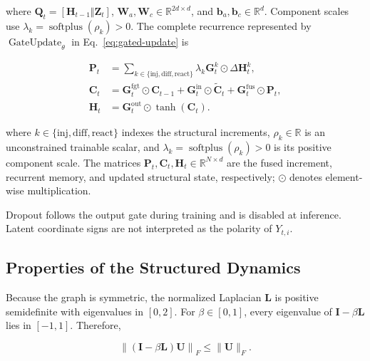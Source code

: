 \documentclass[letterpaper]{article} %
\begin{document}
where \(\mathbf Q_t=[\mathbf H_{t-1}\Vert\mathbf Z_t]\), \(\mathbf W_a,\mathbf W_c\in\mathbb R^{2d\times d}\), and \(\mathbf b_a,\mathbf b_c\in\mathbb R^d\). Component scales use \(\lambda_k=\operatorname{softplus}(\rho_k)>0\). The complete recurrence represented by \(\operatorname{GateUpdate}_{\theta}\) in Eq.~\ref{eq:gated-update} is

\begin{equation}
\begin{aligned}
\mathbf P_t
&=\sum_{k\in\{\mathrm{inj},\mathrm{diff},\mathrm{react}\}}
\lambda_k\mathbf G_t^k\odot\Delta\mathbf H_t^k,\\
\mathbf C_t
&=\mathbf G_t^{\mathrm{fgt}}\odot\mathbf C_{t-1}
+\mathbf G_t^{\mathrm{in}}\odot\widetilde{\mathbf C}_t
+\mathbf G_t^{\mathrm{fus}}\odot\mathbf P_t,\\
\mathbf H_t&=\mathbf G_t^{\mathrm{out}}\odot\tanh(\mathbf C_t).
\end{aligned}
\label{eq:app-full-gated-update}
\end{equation}

where \(k\in\{\mathrm{inj},\mathrm{diff},\mathrm{react}\}\) indexes the structural increments, \(\rho_k\in\mathbb R\) is an unconstrained trainable scalar, and \(\lambda_k=\operatorname{softplus}(\rho_k)>0\) is its positive component scale. The matrices \(\mathbf P_t,\mathbf C_t,\mathbf H_t\in\mathbb R^{N\times d}\) are the fused increment, recurrent memory, and updated structural state, respectively; \(\odot\) denotes element-wise multiplication.

Dropout follows the output gate during training and is disabled at inference. Latent coordinate signs are not interpreted as the polarity of \(Y_{t,i}\).

\subsection{Properties of the Structured Dynamics}
\label{app:dynamics-properties}

Because the graph is symmetric, the normalized Laplacian \(\mathbf L\) is positive semidefinite with eigenvalues in \([0,2]\). For \(\beta\in[0,1]\), every eigenvalue of \(\mathbf I-\beta\mathbf L\) lies in \([-1,1]\). Therefore,

\begin{equation}
\left\|
(\mathbf I-\beta\mathbf L)\mathbf U
\right\|_F
\leq
\|\mathbf U\|_F.
\label{eq:app-diffusion-nonexpansive}
\end{equation}
\end{document}
